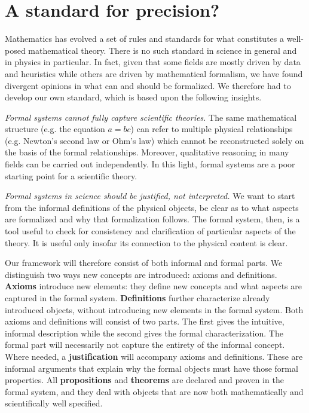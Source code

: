 \documentclass[letterpaper]{article}
\begin{document}
\section{A standard for precision?}

Mathematics has evolved a set of rules and standards for what constitutes a well-posed mathematical theory. There is no such standard in science in general and in physics in particular. In fact, given that some fields are mostly driven by data and heuristics while others are driven by mathematical formalism, we have found divergent opinions in what can and should be formalized. We therefore had to develop our own standard, which is based upon the following insights.

\textit{Formal systems cannot fully capture scientific theories.} The same mathematical structure (e.g. the equation $a= bc$) can refer to multiple physical relationships (e.g. Newton's second law or Ohm's law) which cannot be reconstructed solely on the basis of the formal relationships. Moreover, qualitative reasoning in many fields can be carried out independently. In this light, formal systems are a poor starting point for a scientific theory.

\textit{Formal systems in science should be justified, not interpreted.} We want to start from the informal definitions of the physical objects, be clear as to what aspects are formalized and why that formalization follows. The formal system, then, is a tool useful to check for consistency and clarification of particular aspects of the theory. It is useful only insofar its connection to the physical content is clear.

Our framework will therefore consist of both informal and formal parts. We distinguish two ways new concepts are introduced: axioms and definitions. \textbf{Axioms} introduce new elements: they define new concepts and what aspects are captured in the formal system.  \textbf{Definitions} further characterize already introduced objects, without introducing new elements in the formal system. Both axioms and definitions will consist of two parts. The first gives the intuitive, informal description while the second gives the formal characterization. The formal part will necessarily not capture the entirety of the informal concept. Where needed, a \textbf{justification} will accompany axioms and definitions. These are informal arguments that explain why the formal objects must have those formal properties. All \textbf{propositions} and \textbf{theorems} are declared and proven in the formal system, and they deal with objects that are now both mathematically and scientifically well specified.
\end{document}
